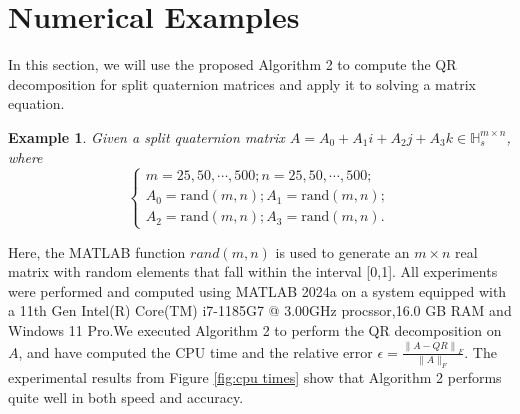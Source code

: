 \documentclass[5p,10pt]{elsarticle}
\newtheorem{example}[theorem]{Example}
\numberwithin{equation}{section}
\begin{document}
\section{Numerical Examples}
In this section,  we will use the proposed  Algorithm 2 to compute the QR decomposition for split quaternion matrices and apply it to solving a matrix equation.
\begin{example}
    Given a split quaternion matrix $A = A_{0}+A_{1}i+A_{2}j+A_{3}k\in \mathbb{H}_s^{m\times n}$, where
    \begin{equation}
       \begin{cases}
            m = 25,50,\cdots,500;
            n = 25,50,\cdots,500;  \\
            A_{0}=\text{rand}(m,n);
            A_{1}=\text{rand}(m,n); \\
            A_{2}=\text{rand}(m,n);
            A_{3}=\text{rand}(m,n).
        \end{cases} \label{eq:example2}
    \end{equation}
\end{example}
Here, the MATLAB function  $rand(m,n)$ is used to generate an $m \times n$ real matrix with random elements that fall within the interval [0,1]. All experiments were performed and computed using MATLAB 2024a on a system equipped with a 11th Gen Intel(R) Core(TM) i7-1185G7 @ 3.00GHz procssor,16.0 GB RAM and Windows 11 Pro.We executed Algorithm 2 to perform the QR decomposition on $A$, and have computed the CPU time and the relative error
$\epsilon = \frac{\left\|A - Q R\right\|_{F}}{\|A\|_{F}}.$
The experimental results from Figure \ref{fig:cpu times} show that Algorithm 2 performs quite well in both speed and accuracy. 
\end{document}
